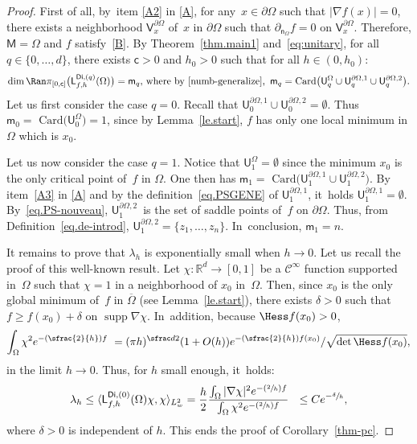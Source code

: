 \documentclass[JEP,XML,SOM,Unicode,NoEqCountersInSection,NoFloatCountersInSection,published]{cedram}
\newcommand{\Psfrac}[2]{(\sfrac{#1}{#2})}
\let\pa\partial
\DeclareMathOperator\supp{supp}
\theoremstyle{plain}
\theoremstyle{definition}
\begin{document}
\begin{proof}
First of all, by~item \eqref{A2} in \ref{A}, for any~$x\in \partial \Omega$ such that $\vert \nabla f(x)\vert =0$, there exists a neighborhood $\mathsf V_x^{\partial \Omega}$ of~$x$ in $\partial \Omega$ such that $ \partial_{\mathsf n_{ \Omega}}f =0 \text{ on } \mathsf V_x^{\partial \Omega}$.
Therefore, $\mathsf M=\Omega$ and $f$ satisfy~\ref{B}.
By Theorem~\ref{thm.main1} and~\eqref{eq:unitary},
for all $q\in \{0,\ldots,d\}$, there exists $\mathsf c>0$ and $h_0>0$ such that for all $h\in (0,h_0)$:
\[
\dim \Ran \pi_{[0,\mathsf c]}\bigl(\mathsf L_{f,h}^{\mathsf{Di},(q)}(\Omega)\bigr)=\mathsf m_q, \,
\text{where by~\eqref{numb-generalize}, }\,
\mathsf m_q=\text{Card}\bigl(\mathsf U_q^{\Omega}\cup \mathsf U^{\partial \Omega,1}_q\cup \mathsf U^{\partial \Omega,2}_q\bigr).
\]
Let us first consider the case $q=0$. Recall that $ \mathsf
U^{\partial \Omega,1}_0\cup \mathsf U^{\partial
\Omega,2}_0=\emptyset$. Thus $\mathsf m_0=\text{ Card}\bigl(\mathsf
U_0^{\Omega})=1$, since by Lemma~\ref{le.start}, $f$ has only one
local minimum in $\Omega$ which is $x_0$.

Let us now consider the case $q=1$. Notice that
$\mathsf U_1^{\Omega}=\emptyset$ since the minimum $x_0$ is the
only
critical point of~$f$ in $\Omega$. One then has
$\mathsf m_1=\text{ Card}\bigl(\mathsf U^{\partial \Omega,1}_1\cup
\mathsf U^{\partial \Omega,2}_1\bigr)$. By item~\eqref{A3} in \ref{A} and
by the definition~\eqref{eq.PSGENE} of $\mathsf U^{\partial \Omega,1}_1$, it~holds $\mathsf U^{\partial \Omega,1}_1=\emptyset$.
By~\eqref{eq.PS-nouveau}, $\mathsf U_1^{\pa \Omega,2}$~is the set
of saddle points of~$f$ on $\partial \Omega$. Thus, from
Definition~\ref{eq.de-introd}, $\mathsf U_1^{\pa
\Omega,2}=\{z_1,\ldots,z_n\}$. In~conclusion, $\mathsf m_1= n$.

It remains to prove that $\lambda_h$ is exponentially small when $h\to
0$. Let us recall the proof of this well-known result. Let $\chi:\mathbb R^d\to [0,1]$ be a $\mathcal C^\infty$ function supported in~$\Omega$ such that $\chi=1$ in a neighborhood of $x_0$ in~$\Omega$. Then, since $x_0$ is the only global minimum of~$f$ in $\overline \Omega$ (see Lemma~\ref{le.start}), there exists $\delta>0$ such that $f\ge f(x_0)+\delta$ on $\supp \nabla \chi$. In~addition, because $\Hess f(x_0)>0$,
\[
\int_{\Omega} \chi^2 e^{-\Psfrac 2h f}  = (\pi h)^{\sfrac d2} (1+O(h))e^{-\Psfrac 2h f(x_0)} /\sqrt{\det \Hess f(x_0)},
\]
in the limit $h\to 0$. Thus, for $h$ small enough, it~holds:\vspace*{-3pt}
\[
\lambda_h\le \langle \mathsf L_{f,h}^{\mathsf{Di}, (0)}(\Omega)\chi, \chi\rangle_{L^2_w}= \frac h2 \frac {\int_{\Omega} |\nabla \chi|^2 e^{-\Psfrac 2h f} }{\int_{\Omega} \chi^2 e^{-\Psfrac 2h f}}  \le Ce^{-\sfrac \delta h},
\]
where $\delta>0$ is independent of $h$.
This ends the proof of Corollary~\ref{thm-pc}.
\end{proof}
\end{document}
